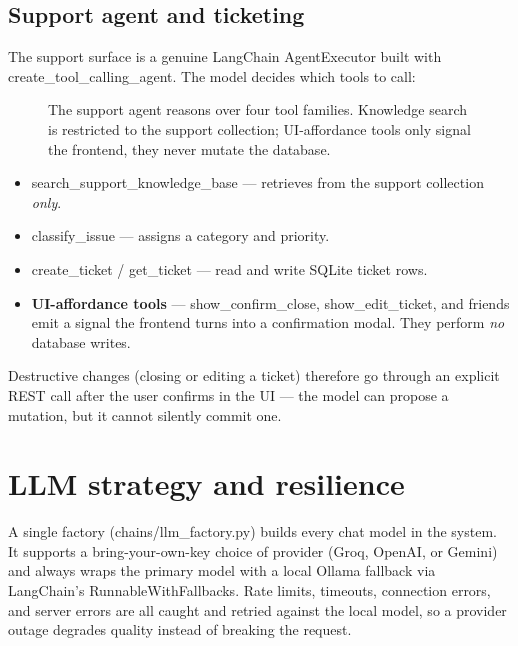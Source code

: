 \documentclass[11pt]{article}
\newcommand{\code}[1]{{\ttfamily\small #1}}
\begin{document}
\subsection{Support agent and ticketing}
The support surface is a genuine LangChain \code{AgentExecutor} built with
\code{create\_tool\_calling\_agent}. The model decides which tools to call:

\begin{figure}[H]
\centering

\caption{The support agent reasons over four tool families. Knowledge search is
restricted to the support collection; UI-affordance tools only signal the frontend,
they never mutate the database.}
\end{figure}

\begin{itemize}
  \item \code{search\_support\_knowledge\_base} --- retrieves from the support collection \emph{only}.
  \item \code{classify\_issue} --- assigns a category and priority.
  \item \code{create\_ticket} / \code{get\_ticket} --- read and write SQLite ticket rows.
  \item \textbf{UI-affordance tools} --- \code{show\_confirm\_close}, \code{show\_edit\_ticket}, and friends emit a signal the frontend turns into a confirmation modal. They perform \emph{no} database writes.
\end{itemize}

\noindent Destructive changes (closing or editing a ticket) therefore go through an
explicit REST call after the user confirms in the UI --- the model can propose a
mutation, but it cannot silently commit one.

\section{LLM strategy and resilience}
\label{sec:llm}

A single factory (\code{chains/llm\_factory.py}) builds every chat model in the
system. It supports a bring-your-own-key choice of provider (Groq, OpenAI, or
Gemini) and always wraps the primary model with a local Ollama fallback via
LangChain's \code{RunnableWithFallbacks}. Rate limits, timeouts, connection errors,
and server errors are all caught and retried against the local model, so a provider
outage degrades quality instead of breaking the request.
\end{document}
